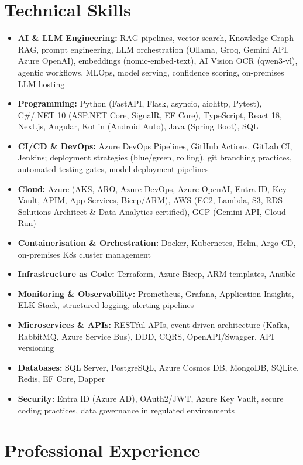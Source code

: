 \documentclass[a4paper,10pt]{article}
\begin{document}
\section*{Technical Skills}
\begin{itemize}[noitemsep]
  \item \textbf{AI \& LLM Engineering:} RAG pipelines, vector search, Knowledge Graph RAG, prompt engineering, LLM orchestration (Ollama, Groq, Gemini API, Azure OpenAI), embeddings (nomic-embed-text), AI Vision OCR (qwen3-vl), agentic workflows, MLOps, model serving, confidence scoring, on-premises LLM hosting
  \item \textbf{Programming:} Python (FastAPI, Flask, asyncio, aiohttp, Pytest), C\#/.NET 10 (ASP.NET Core, SignalR, EF Core), TypeScript, React 18, Next.js, Angular, Kotlin (Android Auto), Java (Spring Boot), SQL
  \item \textbf{CI/CD \& DevOps:} Azure DevOps Pipelines, GitHub Actions, GitLab CI, Jenkins; deployment strategies (blue/green, rolling), git branching practices, automated testing gates, model deployment pipelines
  \item \textbf{Cloud:} Azure (AKS, ARO, Azure DevOps, Azure OpenAI, Entra ID, Key Vault, APIM, App Services, Bicep/ARM), AWS (EC2, Lambda, S3, RDS --- Solutions Architect \& Data Analytics certified), GCP (Gemini API, Cloud Run)
  \item \textbf{Containerisation \& Orchestration:} Docker, Kubernetes, Helm, Argo CD, on-premises K8s cluster management
  \item \textbf{Infrastructure as Code:} Terraform, Azure Bicep, ARM templates, Ansible
  \item \textbf{Monitoring \& Observability:} Prometheus, Grafana, Application Insights, ELK Stack, structured logging, alerting pipelines
  \item \textbf{Microservices \& APIs:} RESTful APIs, event-driven architecture (Kafka, RabbitMQ, Azure Service Bus), DDD, CQRS, OpenAPI/Swagger, API versioning
  \item \textbf{Databases:} SQL Server, PostgreSQL, Azure Cosmos DB, MongoDB, SQLite, Redis, EF Core, Dapper
  \item \textbf{Security:} Entra ID (Azure AD), OAuth2/JWT, Azure Key Vault, secure coding practices, data governance in regulated environments
\end{itemize}

\section*{Professional Experience}
\end{document}
